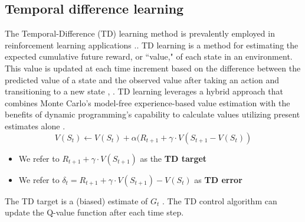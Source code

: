 \subsection{Temporal difference learning}

The Temporal-Difference (TD) learning method is prevalently employed in reinforcement learning applications \cite{RL3}.. TD learning is a method for estimating the expected cumulative future reward, or ``value," of each state in an environment. This value is updated at each time increment based on the difference between the predicted value of a state and the observed value after taking an action and transitioning to a new state \cite{RL}, \cite{RL2}.
TD learning leverages a hybrid approach that combines Monte Carlo's model-free experience-based value estimation with the benefits of dynamic programming's capability to calculate values utilizing present estimates alone \cite{sutton1988b}. 
\begin{equation}
    V(S_t) \leftarrow V(S_t) + \alpha(R_{t+1} + \gamma \cdot V(S_{t+1} - V(S_t))
\end{equation}
\begin{itemize}
    \item We refer to $R_{t+1} + \gamma \cdot V(S_{t+1})$ as the \textbf{TD target}
    \item We refer to $\delta_{t} = R_{t+1} + \gamma \cdot V(S_{t+1}) - V(S_{t})$ as  \textbf{TD error}
\end{itemize}
The TD target is a (biased) estimate of $G_t$ \cite{RL}. The TD control algorithm can update the Q-value function after each time step. 



